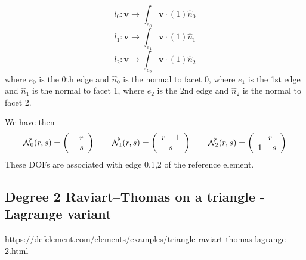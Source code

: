 \[
l_0: {\bm v} \rightarrow \int_{e_0} {\bm v} \cdot (1) \hat{n}_0
\]
\[
l_1: {\bm v} \rightarrow \int_{e_1} {\bm v} \cdot (1) \hat{n}_1
\]
\[
l_2: {\bm v} \rightarrow \int_{e_2} {\bm v} \cdot (1) \hat{n}_2
\]
where $e_0$ is the 0th edge and $\hat{n}_0$ is the normal to facet 0,
where $e_1$ is the 1st edge and $\hat{n}_1$ is the normal to facet 1,
where $e_2$ is the 2nd edge and $\hat{n}_2$ is the normal to facet 2.

We have then
\[
\vec{{\mathcal{N}}}_0(r,s) = \left( \begin{array}{c} -r\\-s  \end{array} \right)
\qquad
\vec{{\mathcal{N}}}_1(r,s) = \left( \begin{array}{c} r-1\\s  \end{array} \right)
\qquad
\vec{{\mathcal{N}}}_2(r,s) = \left( \begin{array}{c} -r \\ 1-s  \end{array} \right)
\]
These DOFs are associated with edge 0,1,2 of the reference element.

\subsection{Degree 2 Raviart–Thomas on a triangle - Lagrange variant}

\url{https://defelement.com/elements/examples/triangle-raviart-thomas-lagrange-2.html}

